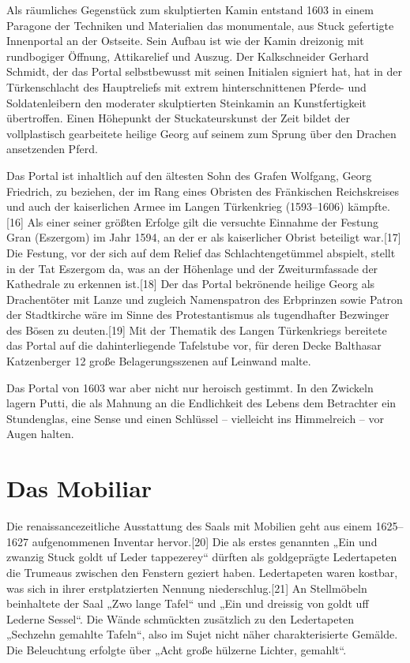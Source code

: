 \documentclass[
  a4paper,
  openany]{book}
\begin{document}
Als räumliches Gegenstück zum skulptierten Kamin entstand 1603 in einem
Paragone der Techniken und Materialien das monumentale, aus Stuck
gefertigte Innenportal an der Ostseite. Sein Aufbau ist wie der Kamin
dreizonig mit rundbogiger Öffnung, Attikarelief und Auszug. Der
Kalkschneider Gerhard Schmidt, der das Portal selbstbewusst mit seinen
Initialen signiert hat, hat in der Türkenschlacht des Hauptreliefs mit
extrem hinterschnittenen Pferde- und Soldatenleibern den moderater
skulptierten Steinkamin an Kunstfertigkeit übertroffen. Einen Höhepunkt
der Stuckateurskunst der Zeit bildet der vollplastisch gearbeitete
heilige Georg auf seinem zum Sprung über den Drachen ansetzenden Pferd.

Das Portal ist inhaltlich auf den ältesten Sohn des Grafen Wolfgang,
Georg Friedrich, zu beziehen, der im Rang eines Obristen des Fränkischen
Reichskreises und auch der kaiserlichen Armee im Langen Türkenkrieg
(1593--1606) kämpfte.{[}16{]} Als einer seiner größten Erfolge gilt die
versuchte Einnahme der Festung Gran (Eszergom) im Jahr 1594, an der er
als kaiserlicher Obrist beteiligt war.{[}17{]} Die Festung, vor der sich
auf dem Relief das Schlachtengetümmel abspielt, stellt in der Tat
Eszergom da, was an der Höhenlage und der Zweiturmfassade der Kathedrale
zu erkennen ist.{[}18{]} Der das Portal bekrönende heilige Georg als
Drachentöter mit Lanze und zugleich Namenspatron des Erbprinzen sowie
Patron der Stadtkirche wäre im Sinne des Protestantismus als
tugendhafter Bezwinger des Bösen zu deuten.{[}19{]} Mit der Thematik des
Langen Türkenkriegs bereitete das Portal auf die dahinterliegende
Tafelstube vor, für deren Decke Balthasar Katzenberger 12 große
Belagerungsszenen auf Leinwand malte.

Das Portal von 1603 war aber nicht nur heroisch gestimmt. In den
Zwickeln lagern Putti, die als Mahnung an die Endlichkeit des Lebens dem
Betrachter ein Stundenglas, eine Sense und einen Schlüssel -- vielleicht
ins Himmelreich -- vor Augen halten.

\section{Das Mobiliar}\label{das-mobiliar}

Die renaissancezeitliche Ausstattung des Saals mit Mobilien geht aus
einem 1625--1627 aufgenommenen Inventar hervor.{[}20{]} Die als erstes
genannten „Ein und zwanzig Stuck goldt uf Leder tappezerey`` dürften als
goldgeprägte Ledertapeten die Trumeaus zwischen den Fenstern geziert
haben. Ledertapeten waren kostbar, was sich in ihrer erstplatzierten
Nennung niederschlug.{[}21{]} An Stellmöbeln beinhaltete der Saal „Zwo
lange Tafel`` und „Ein und dreissig von goldt uff Lederne Sessel``. Die
Wände schmückten zusätzlich zu den Ledertapeten „Sechzehn gemahlte
Tafeln``, also im Sujet nicht näher charakterisierte Gemälde. Die
Beleuchtung erfolgte über „Acht große hülzerne Lichter, gemahlt``.
\end{document}

